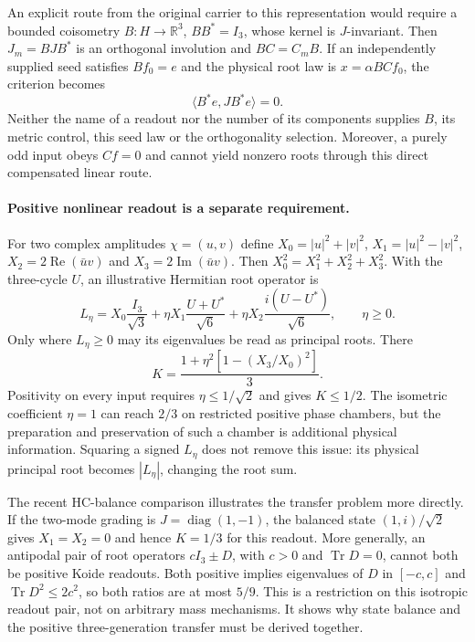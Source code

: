 \documentclass[11pt,a4paper]{article}
\begin{document}
An explicit route from the original carrier to this representation
would require a bounded coisometry $B:H\to\mathbb R^3$, $BB^*=I_3$,
whose kernel is $J$-invariant. Then $J_m=BJB^*$ is an orthogonal
involution and $BC=C_mB$. If an independently supplied seed satisfies
$Bf_0=e$ and the physical root law is $x=\alpha BCf_0$, the criterion
becomes
\begin{equation}
 \langle B^*e,JB^*e\rangle=0.
\end{equation}
Neither the name of a readout nor the number of its components supplies
$B$, its metric control, this seed law or the orthogonality selection.
Moreover, a purely odd input obeys $Cf=0$ and cannot yield nonzero roots
through this direct compensated linear route.

\paragraph{Positive nonlinear readout is a separate requirement.}
For two complex amplitudes $\chi=(u,v)$ define
$X_0=|u|^2+|v|^2$, $X_1=|u|^2-|v|^2$,
$X_2=2\operatorname{Re}(\bar uv)$ and
$X_3=2\operatorname{Im}(\bar uv)$. Then
$X_0^2=X_1^2+X_2^2+X_3^2$. With the three-cycle $U$, an illustrative
Hermitian root operator is
\begin{equation}
 L_\eta=X_0\frac{I_3}{\sqrt3}
 +\eta X_1\frac{U+U^*}{\sqrt6}
 +\eta X_2\frac{i(U-U^*)}{\sqrt6},\qquad \eta\geq0.
\end{equation}
Only where $L_\eta\geq0$ may its eigenvalues be read as principal
roots. There
\begin{equation}
 K=\frac{1+\eta^2[1-(X_3/X_0)^2]}3.
\end{equation}
Positivity on every input requires $\eta\leq1/\sqrt2$ and gives
$K\leq1/2$. The isometric coefficient $\eta=1$ can reach $2/3$
on restricted positive phase chambers, but the preparation and
preservation of such a chamber is additional physical information.
Squaring a signed $L_\eta$ does not remove this issue: its physical
principal root becomes $|L_\eta|$, changing the root sum.

The recent HC-balance comparison illustrates the transfer problem
more directly. If the two-mode grading is $J=\operatorname{diag}(1,-1)$,
the balanced state $(1,i)/\sqrt2$ gives $X_1=X_2=0$ and hence $K=1/3$
for this readout. More generally, an antipodal pair of root operators
$cI_3\pm D$, with $c>0$ and $\operatorname{Tr}D=0$, cannot both
be positive Koide readouts. Both positive implies eigenvalues of $D$
in $[-c,c]$ and $\operatorname{Tr}D^2\leq2c^2$, so both ratios
are at most $5/9$. This is a restriction on this isotropic readout
pair, not on arbitrary mass mechanisms. It shows why state balance
and the positive three-generation transfer must be derived together.
\end{document}
